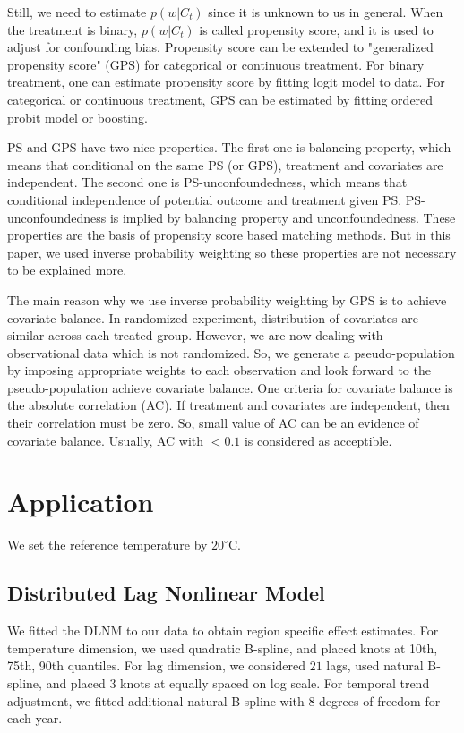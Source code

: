 \documentclass[12pt]{article}
\begin{document}
Still, we need to estimate $p(w\lvert C_t)$ since it is unknown to us in general.
When the treatment is binary, $p(w\lvert C_t)$ is called propensity score,
and it is used to adjust for confounding bias\cite{rosenbaum1983}.
Propensity score can be extended to 
"generalized propensity score" (GPS) for categorical or continuous treatment\cite{imbens2000}.
For binary treatment, one can estimate propensity score by fitting logit model to data.
For categorical or continuous treatment, GPS can be estimated by fitting ordered probit model or boosting.

PS and GPS have two nice properties\cite{rosenbaum1983, hirano2004}.
The first one is balancing property, which means that conditional on the same PS (or GPS),
treatment and covariates are independent.
The second one is PS-unconfoundedness, 
which means that conditional independence of potential outcome and treatment given PS.
PS-unconfoundedness is implied by balancing property and unconfoundedness.
These properties are the basis of propensity score based matching methods.
But in this paper, 
we used inverse probability weighting so these properties are not necessary to be explained more.

The main reason why we use inverse probability weighting by GPS is to achieve covariate balance.
In randomized experiment, distribution of covariates are similar across each treated group.
However, we are now dealing with observational data which is not randomized.
So, we generate a pseudo-population by imposing appropriate weights to each observation
and look forward to the pseudo-population achieve covariate balance.
One criteria for covariate balance is the absolute correlation (AC)\cite{gpsboosting2015}.
If treatment and covariates are independent, then their correlation must be zero.
So, small value of AC can be an evidence of covariate balance.
Usually, AC with $ <0.1 $ is considered as acceptible.


\section{Application}
\label{section:application}

We set the reference temperature by $20^\circ$C.
\subsection{Distributed Lag Nonlinear Model}

We fitted the DLNM to our data to obtain region specific effect estimates.
For temperature dimension, 
we used quadratic B-spline, and placed knots at 10th, 75th, 90th quantiles.
For lag dimension,
we considered $21$ lags, used natural B-spline, and placed $3$ knots at equally spaced on log scale.
For temporal trend adjustment,
we fitted additional natural B-spline with $8$ degrees of freedom for each year.
\end{document}
